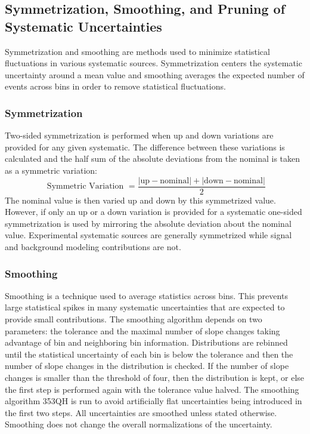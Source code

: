 \subsection{Symmetrization, Smoothing, and Pruning of Systematic Uncertainties}

Symmetrization and smoothing are methods used to minimize statistical fluctuations in various systematic sources.  Symmetrization centers the systematic uncertainty around a mean value and smoothing averages the expected number of events across bins in order to remove statistical fluctuations.

\subsubsection{Symmetrization}
Two-sided symmetrization is performed when up and down variations are provided for any given systematic.  The difference between these variations is calculated and the half sum of the absolute deviations from the nominal is taken as a symmetric variation:
\[ \text{ Symmetric Variation } = \frac{|\text{up} - \text{nominal}| +|\text{down}-\text{nominal}|}{2}  \]
The nominal value is then varied up and down by this symmetrized value.  However, if only an up or a down variation is provided for a systematic one-sided symmetrization is used by mirroring the absolute deviation about the nominal value.  Experimental systematic sources are generally symmetrized while signal and background modeling contributions are not.

\subsubsection{Smoothing}
Smoothing is a technique used to average statistics across bins.  This prevents large statistical spikes in many systematic uncertainties that are expected to provide small contributions.  The smoothing algorithm depends on two parameters: the tolerance and the maximal number of slope changes taking advantage of bin and neighboring bin information.  Distributions are rebinned until the statistical uncertainty of each bin is below the tolerance and then the number of slope changes in the distribution is checked.  If the number of slope changes is smaller than the threshold of four, then the distribution is kept, or else the first step is performed again with the tolerance value halved.  The smoothing algorithm 353QH \cite{Friedman:695770} is run to avoid artificially flat uncertainties being introduced in the first two steps.  All uncertainties are smoothed unless stated otherwise.  Smoothing does not change the overall normalizations of the uncertainty.

